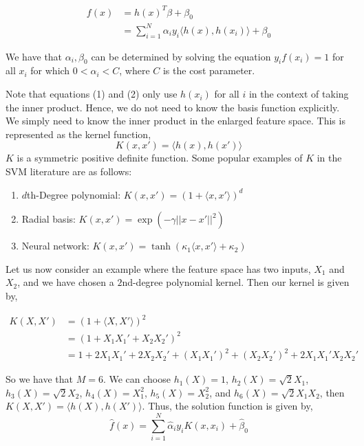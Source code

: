 \documentclass[12pt]{article}\usepackage[]{graphicx}\usepackage[]{color}
\begin{document}
\begin{align}
f(x) &= h(x)^T \beta + \beta_0 \nonumber \\
&= \sum_{i=1}^N \alpha_i y_i \langle h(x), h(x_i) \rangle + \beta_0
\end{align}

We have that $\alpha_i, \beta_0$ can be determined by solving the equation $y_i f(x_i) = 1$ for all $x_i$ for which $0 < \alpha_i < C$, where $C$ is the cost parameter.

Note that equations (1) and (2) only use $h(x_i)$ for all $i$ in the context of taking the inner product. Hence, we do not need to know the basis function explicitly. We simply need to know the inner product in the enlarged feature space. This is represented as the kernel function, $$K(x, x') = \langle h(x), h(x') \rangle$$ $K$ is a symmetric positive definite function. Some popular examples of $K$ in the SVM literature are as follows:

\begin{enumerate}

\item $d$th-Degree polynomial: $K(x, x') = (1 + \langle x, x' \rangle)^d$

\item Radial basis: $K(x,x') = \exp(-\gamma ||x-x'||^2)$

\item Neural network: $K(x, x') = \tanh(\kappa_1 \langle x, x' \rangle + \kappa_2)$

\end{enumerate}

Let us now consider an example where the feature space has two inputs, $X_1$ and $X_2$, and we have chosen a $2$nd-degree polynomial kernel. Then our kernel is given by,

\begin{align*}
K(X, X') &= (1 + \langle X, X' \rangle)^2\\
&= (1 + X_1 X_1' + X_2 X_2')^2\\
&= 1 + 2X_1X_1' + 2X_2X_2' + (X_1 X_1')^2 + (X_2 X_2')^2 + 2X_1 X_1' X_2 X_2'
\end{align*}

So we have that $M = 6$. We can choose $h_1(X) = 1$, $h_2(X) = \sqrt{2}X_1$, $h_3(X) = \sqrt{2} X_2$, $h_4(X) = X_1^2$, $h_5(X) = X_2^2$, and $h_6(X) = \sqrt{2}X_1 X_2$, then $K(X, X') = \langle h(X), h(X') \rangle$. Thus, the solution function is given by, $$\hat{f}(x) = \sum_{i=1}^N \hat{\alpha}_i y_i K(x, x_i) + \hat{\beta}_0$$
\end{document}
